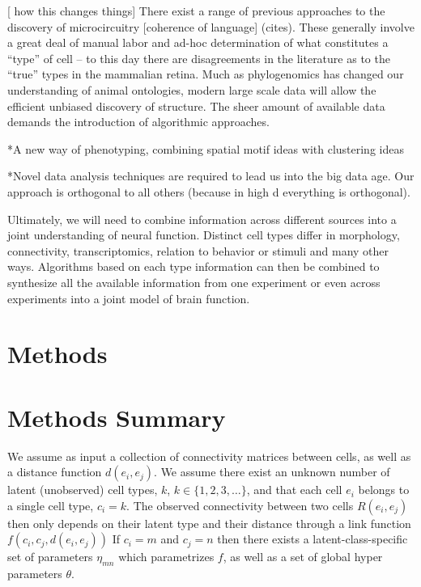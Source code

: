\documentclass{nature}
\begin{document}
[ how this changes things]
There exist a range of previous approaches to the discovery of microcircuitry [coherence of language] (cites). These generally involve a great deal of manual labor and ad-hoc determination of what constitutes a “type” of cell -- to this day there are disagreements in the literature as to the “true” types in the mammalian retina. Much as phylogenomics has changed our understanding of animal ontologies, modern large scale data will allow the efficient unbiased discovery of structure. The sheer amount of available data demands the introduction of algorithmic approaches. 


*A new way of phenotyping, combining spatial motif ideas with clustering ideas

*Novel data analysis techniques are required to lead us into the big data age. Our approach is orthogonal to all others (because in high d everything is orthogonal).

Ultimately, we will need to combine information across different sources into a joint understanding of neural function. Distinct cell types differ in morphology, connectivity, transcriptomics, relation to behavior or stimuli and many other ways. Algorithms based on each type information can then be combined to synthesize all the available information from one experiment or even across experiments into a joint model of brain function.


\section{Methods}
\section{Methods Summary}





We assume as input a collection of connectivity matrices between
cells, as well as a distance function $d(e_i, e_j)$. We assume there
exist an unknown number of latent (unobserved) cell types, $k$, $k \in
\{1, 2, 3, \dots\}$, and that each cell $e_i$ belongs to a single cell
type, $c_i = k$. The observed connectivity between two cells $R(e_i,
e_j)$ then only depends on their latent type and their distance
through a link function $f(c_i, c_j, d(e_i, e_j))$ If $c_i=m$ and
$c_j=n$ then there exists a latent-class-specific set of parameters
$\eta_{mn}$ which parametrizes $f$, as well as a set of global hyper parameters $\theta$. 
\end{document}
